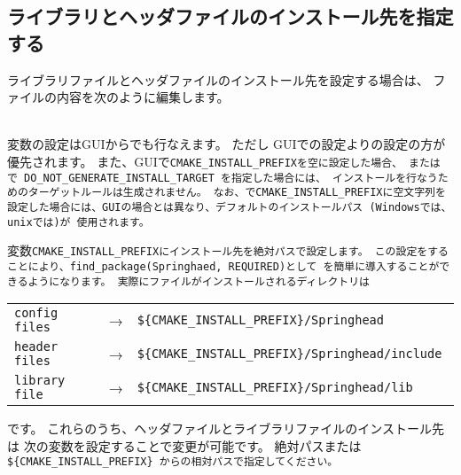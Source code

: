 \subsection{ライブラリとヘッダファイルのインストール先を指定する}
\label{subsec:SetInstallDirectory}
\parindent=0pt

ライブラリファイルとヘッダファイルのインストール先を設定する場合は、
ファイル\Path{\CMakeConf{}}の内容を次のように編集します。

\begin{narrow}[s]
	\thinrule{\linewidth}\\
	変数の設定はGUIからでも行なえます。
	ただし GUIでの設定よりの設定の方が優先されます。
	また、GUIで\tt{CMAKE\_INSTALL\_PREFIX}を空に設定した場合、
	または で \tt{DO\_NOT\_GENERATE\_INSTALL\_TARGET}
	を指定した場合には、
	インストールを行なうためのターゲットルールは生成されません。
	なお、で\tt{CMAKE\_INSTALL\_PREFIX}に空文字列を
	設定した場合には、GUIの場合とは異なり、デフォルトのインストールパス
 	(Windowsでは、unixでは)が
	使用されます。
	\thinrule{\linewidth}\\
\end{narrow}

変数\tt{CMAKE\_INSTALL\_PREFIX}にインストール先を絶対パスで設定します。
この設定をすることにより、\tt{find\_package(Springhaed, REQUIRED)}として
\SprLib を簡単に導入することができるようになります。
\medskip
実際にファイルがインストールされるディレクトリは
\def\IP{\$\{CMAKE\_INSTALL\_PREFIX\}}
\begin{narrow}[s]
	\begin{tabular}{lcl}
		\tt{config files} & → & \tt{\IP/Springhead} \\
		\tt{header files} & → & \tt{\IP/Springhead/include} \\
		\tt{library file} & → & \tt{\IP/Springhead/lib} \\
	\end{tabular}
\end{narrow}
です。
これらのうち、ヘッダファイルとライブラリファイルのインストール先は
次の変数を設定することで変更が可能です。
絶対パスまたは\tt{\,\IP\,}からの相対パスで指定してください。

\bigskip
